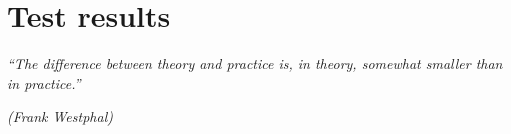 \chapter{Test results}
\epigraph{\em ``The difference between theory and practice is, in theory, somewhat
smaller than in practice.''}{\em (Frank Westphal)}
